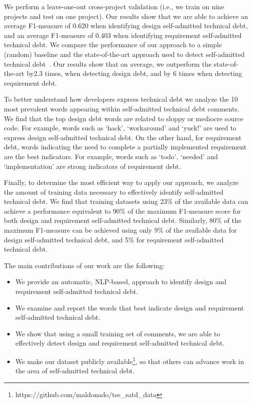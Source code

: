 \documentclass[10pt,journal,compsoc]{IEEEtran}
\newcommand{\SATD}{self-admitted technical debt\xspace}
\newcommand{\revised}[2]{{#1}}
\begin{document}
We perform a leave-one-out cross-project validation (i.e., we train on nine projects and test on one project). Our results show that we are able to  achieve an average F1-measure of 0.620 when identifying design \SATD, and an average F1-measure of 0.403 when identifying requirement \SATD. We compare the performance of our approach to a simple (random) baseline and the state-of-the-art approach used to detect \SATD~\cite{Potdar2014ICSME}. Our results show that on average, we outperform the state-of-the-art by\revised{2.3 times, when detecting design debt, and by 6 times when detecting requirement debt.}{R1-8}

To better understand how developers express technical debt we analyze the 10 most prevalent words appearing within \SATD comments. 
We find that the top design debt words are related to sloppy or mediocre source code. For example, words such as `hack', `workaround' and `yuck!' are used to express design \SATD. On the other hand, for requirement debt, words indicating the need to complete a partially implemented requirement are the best indicators. For example, words such as `todo', `needed' and `implementation' are strong indicators of requirement debt. 

Finally, to determine the most efficient way to apply our approach, we analyze the amount of training data necessary to effectively identify \SATD. We find that training datasets using 23\% of the available data can achieve a performance equivalent to 90\% of the maximum F1-measure score for both design and requirement \SATD. Similarly, 80\% of the maximum F1-measure can be achieved using only 9\% of the available data for design \SATD, and 5\% for requirement \SATD.

The main contributions of our work are the following:
\vspace{-1.5mm}
\begin{itemize}
  \item We provide an automatic, NLP-based, approach to identify design and requirement \SATD.
  \item We examine and report the words that best indicate design and requirement \SATD.
  \item We show that using a small training set of comments, we are able to effectively detect design and requirement \SATD.
  \item We make our dataset publicly available\footnote{https://github.com/maldonado/tse\_satd\_data}, so that others can advance work in the area of \SATD.
\end{itemize}
\end{document}
